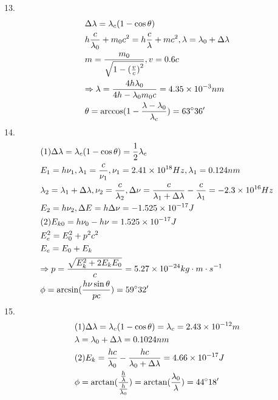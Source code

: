 \documentclass{article}
\begin{document}
13.\[\begin{gathered}
\Delta \lambda  = {\lambda _c}(1 - \cos \theta ) \hfill \\
h\frac{c}{{{\lambda _0}}} + {m_0}{c^2} = h\frac{c}{\lambda } + m{c^2},\lambda  = {\lambda _0} + \Delta \lambda  \hfill \\
m = \frac{{{m_0}}}{{\sqrt {1 - {{(\frac{v}{c})}^2}} }},v = 0.6c \hfill \\
\Rightarrow \lambda  = \frac{{4h{\lambda _0}}}{{4h - {\lambda _0}{m_0}c}} = 4.35 \times {10^{ - 3}}nm \hfill \\
\theta  = \arccos (1 - \frac{{\lambda  - {\lambda _0}}}{{{\lambda _c}}}) = {63^ \circ }36' \hfill \\ 
\end{gathered} \]
14.\[\begin{gathered}
(1)\Delta \lambda  = {\lambda _c}(1 - \cos \theta ) = \frac{1}{2}{\lambda _c} \hfill \\
{E_1} = h{\nu _1},{\lambda _1} = \frac{c}{{{\nu _1}}},{\nu _1} = 2.41 \times {10^{18}}Hz,{\lambda _1} = 0.124nm \hfill \\
{\lambda _2} = {\lambda _1} + \Delta \lambda ,{\nu _2} = \frac{c}{{{\lambda _2}}},\Delta \nu  = \frac{c}{{{\lambda _1} + \Delta \lambda }} - \frac{c}{{{\lambda _1}}} =  - 2.3 \times {10^{16}}Hz \hfill \\
{E_2} = h{\nu _2},\Delta E = h\Delta \nu  =  - 1.525 \times {10^{ - 17}}J \hfill \\
(2){E_{k0}} = h{\nu _0} - h\nu  = 1.525 \times {10^{ - 17}}J \hfill \\
E_e^2 = E_0^2 + {p^2}{c^2} \hfill \\
{E_e} = {E_0} + {E_k} \hfill \\
\Rightarrow p = \frac{{\sqrt {E_k^2 + 2{E_k}{E_0}} }}{c} = 5.27 \times {10^{ - 24}}kg \cdot m \cdot {s^{ - 1}} \hfill \\
\phi  = \arcsin (\frac{{h\nu \sin \theta }}{{pc}}) = {59^ \circ }32' \hfill \\ 
\end{gathered} \]
15.\[\begin{gathered}
(1)\Delta \lambda  = {\lambda _c}(1 - \cos \theta ) = {\lambda _c} = 2.43 \times {10^{ - 12}}m \hfill \\
\lambda  = {\lambda _0} + \Delta \lambda  = 0.1024nm \hfill \\
(2){E_k} = \frac{{hc}}{{{\lambda _0}}} - \frac{{hc}}{{{\lambda _0} + \Delta \lambda }} = 4.66 \times {10^{ - 17}}J \hfill \\
\phi  = \arctan (\frac{{\frac{h}{\lambda }}}{{\frac{h}{{{\lambda _0}}}}}) =  \arctan (\frac{{{\lambda _0}}}{\lambda }) = {44^ \circ }18' \hfill \\ 
\end{gathered} \]
\end{document}
